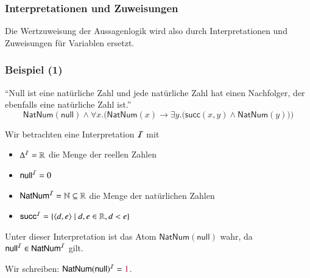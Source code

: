 \documentclass[aspectratio=1610,onlymath]{beamer}
\begin{document}
\begin{frame}\frametitle{Interpretationen und Zuweisungen}

Die Wertzuweisung der Aussagenlogik wird also durch \alert{Interpretationen}
und \alert{Zuweisungen} für Variablen ersetzt.
\smallskip



\end{frame}

\begin{frame}[t]\frametitle{Beispiel (1)}

\alert{"`Null ist eine natürliche Zahl und jede natürliche Zahl hat einen Nachfolger, der
ebenfalls eine natürliche Zahl ist."'}
\[ \textsf{NatNum}(\textsf{null})\wedge \forall x.\Big(\textsf{NatNum}(x)\to\exists y.\big(\textsf{succ}(x,y)\wedge \textsf{NatNum}(y)\big)\Big)\]

Wir betrachten eine Interpretation $\mathcal{I}$ mit
\begin{itemize}
\item $\Delta^{\mathcal{I}}=\mathbb{R}$ die Menge der reellen Zahlen
\item $\textsf{null}^{\mathcal{I}}=0$
\item $\textsf{NatNum}^{\mathcal{I}}=\mathbb{N}\subseteq\mathbb{R}$ die Menge der natürlichen Zahlen
\item $\textsf{succ}^{\mathcal{I}}=\{\langle{d,e}\rangle\mid d,e\in\mathbb{R},d<e\}$
\end{itemize}

Unter dieser Interpretation ist das Atom $\textsf{NatNum}(\textsf{null})$ wahr, da
$\textsf{null}^{\mathcal{I}}\in\textsf{NatNum}^{\mathcal{I}}$ gilt.
\smallskip

Wir schreiben: $\textsf{NatNum}(\textsf{null})^{\mathcal{I}}=\textcolor{purple}{1}$.

\end{frame}
\end{document}
